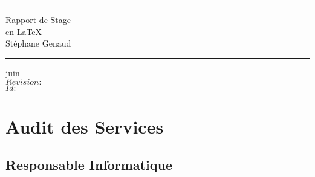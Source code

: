 \documentclass{book}
\begin{document}
\newcommand{\motcle}[1]{\index{#1}\emph{#1}}
\newcommand{\sre}{service relations entreprises\xspace}
\newcommand{\sop}{service organisation et process\xspace}
\newcommand{\scom}{service communication\xspace}
\newcommand{\sconc}{service concours\xspace}
\newcommand{\CK}{Christos Karacostas\xspace}


\thispagestyle{empty}
\rhead[]{}
\pagestyle{fancy}
\setlength{\parindent}{0mm}
\setlength{\parskip}{0mm}
\rule{\linewidth}{1mm}
\begin{center}
\Large{Rapport de Stage}\\[5mm]
\Large{en \LaTeX}\\[5mm]
\large{Stéphane Genaud}
\rule{\linewidth}{1mm}
\end{center}
\begin{center}
juin  \\
\textrm{
$Revision:$\\	%
$Id:  $\\		%
}
\end{center}

\tableofcontents
\newpage

 
 

\chapter{Audit des Services}
 

\section{Responsable Informatique}
\end{document}
